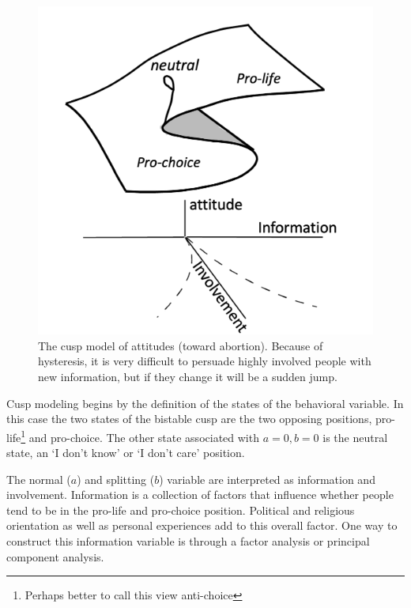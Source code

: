 \documentclass[
  a4paper,
  DIV=11,
  numbers=noendperiod]{scrreprt}
\begin{document}
\begin{figure}

{\centering \includegraphics{media/ch3/image13.jpg}

}

\caption{\label{fig-ch3-img13-old-25}The cusp model of attitudes (toward
abortion). Because of hysteresis, it is very difficult to persuade
highly involved people with new information, but if they change it will
be a sudden jump.}

\end{figure}

Cusp modeling begins by the definition of the states of the behavioral
variable. In this case the two states of the bistable cusp are the two
opposing positions, pro-life\footnote{Perhaps better to call this view
  anti-choice} and pro-choice. The other state associated with
\(a = 0, b = 0\) is the neutral state, an `I don't know' or `I don't
care' position.

The normal (\(a\)) and splitting (\(b\)) variable are interpreted as
information and involvement. Information is a collection of factors that
influence whether people tend to be in the pro-life and pro-choice
position. Political and religious orientation as well as personal
experiences add to this overall factor. One way to construct this
information variable is through a factor analysis or principal component
analysis.
\end{document}
